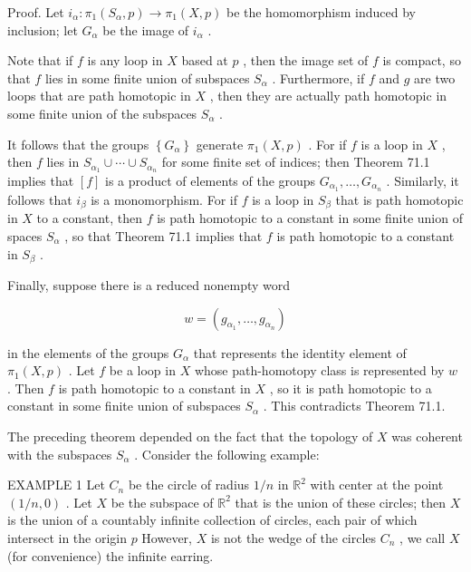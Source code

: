 Proof. Let \({i}_{\alpha } : {\pi }_{1}\left( {{S}_{\alpha },p}\right)  \rightarrow  {\pi }_{1}\left( {X,p}\right)\) be the homomorphism induced by inclusion; let \({G}_{\alpha }\) be the image of \({i}_{\alpha }\) .

Note that if \(f\) is any loop in \(X\) based at \(p\) , then the image set of \(f\) is compact, so that \(f\) lies in some finite union of subspaces \({S}_{\alpha }\) . Furthermore, if \(f\) and \(g\) are two loops that are path homotopic in \(X\) , then they are actually path homotopic in some finite union of the subspaces \({S}_{\alpha }\) .

It follows that the groups \(\left\{  {G}_{\alpha }\right\}\) generate \({\pi }_{1}\left( {X,p}\right)\) . For if \(f\) is a loop in \(X\) , then \(f\) lies in \({S}_{{\alpha }_{1}} \cup  \cdots  \cup  {S}_{{\alpha }_{n}}\) for some finite set of indices; then Theorem 71.1 implies that \(\left\lbrack  f\right\rbrack\) is a product of elements of the groups \({G}_{{\alpha }_{1}},\ldots ,{G}_{{\alpha }_{n}}\) . Similarly, it follows that \({i}_{\beta }\) is a monomorphism. For if \(f\) is a loop in \({S}_{\beta }\) that is path homotopic in \(X\) to a constant, then \(f\) is path homotopic to a constant in some finite union of spaces \({S}_{\alpha }\) , so that Theorem 71.1 implies that \(f\) is path homotopic to a constant in \({S}_{\beta }\) .

Finally, suppose there is a reduced nonempty word

\[
w = \left( {{g}_{{\alpha }_{1}},\ldots ,{g}_{{\alpha }_{n}}}\right)
\]

in the elements of the groups \({G}_{\alpha }\) that represents the identity element of \({\pi }_{1}\left( {X,p}\right)\) . Let \(f\) be a loop in \(X\) whose path-homotopy class is represented by \(w\) . Then \(f\) is path homotopic to a constant in \(X\) , so it is path homotopic to a constant in some finite union of subspaces \({S}_{\alpha }\) . This contradicts Theorem 71.1.

The preceding theorem depended on the fact that the topology of \(X\) was coherent with the subspaces \({S}_{\alpha }\) . Consider the following example:

EXAMPLE 1 Let \({C}_{n}\) be the circle of radius \(1/n\) in \({\mathbb{R}}^{2}\) with center at the point \(\left( {1/n,0}\right)\) . Let \(X\) be the subspace of \({\mathbb{R}}^{2}\) that is the union of these circles; then \(X\) is the union of a countably infinite collection of circles, each pair of which intersect in the origin \(p\) However, \(X\) is not the wedge of the circles \({C}_{n}\) , we call \(X\) (for convenience) the infinite earring.

